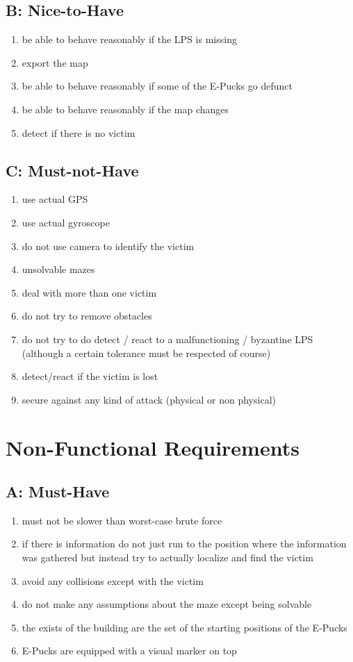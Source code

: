 \documentclass[a4paper,parskip,headheight=38pt]{scrartcl} %
\begin{document}
\subsection*{B: Nice-to-Have}
\begin{enumerate}[label=\nicetohave]
\item be able to behave reasonably if the LPS is missing
\item export the map
\item be able to behave reasonably if some of the E-Pucks go defunct
\item be able to behave reasonably if the map changes
\item detect if there is no victim
\end{enumerate}

\subsection*{C: Must-not-Have}
\begin{enumerate}[label=\mustnothave]
\item use actual GPS
\item use actual gyroscope
\item do not use camera to identify the victim
\item unsolvable mazes
\item deal with more than one victim
\item do not try to remove obstacles
\item do not try to do detect / react to a malfunctioning / byzantine LPS (although a certain tolerance must be respected of course)
\item detect/react if the victim is lost
\item secure against any kind of attack (physical or non physical)
\end{enumerate}

\section{Non-Functional Requirements}
\subsection*{A: Must-Have}
\begin{enumerate}[label=\musthave]
\item must not be slower than worst-case brute force
\item if there is information do not just run to the position where the information was gathered but instead try to actually localize and find the victim
\item avoid any collisions except with the victim
\item do not make any assumptions about the maze except being solvable
\item the exists of the building are the set of the starting positions of the E-Pucks
\item E-Pucks are equipped with a visual marker on top
\end{enumerate}
\end{document}
